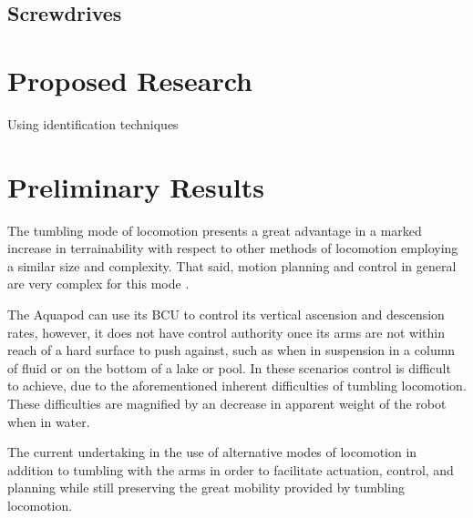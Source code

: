 



\subsection*{Screwdrives}

\section*{Proposed Research}

Using identification techniques  



\section*{Preliminary Results}

The tumbling mode of locomotion presents a great advantage in a marked increase
in terrainability with respect to other methods of locomotion employing a
similar size and complexity. That said, motion planning and control in general
are very complex for this mode \cite{Hemes2011}.

The Aquapod can use its BCU to control its vertical ascension and descension
rates, however, it does not have control authority once its arms are not within
reach of a hard surface to push against, such as when in suspension in a column
of fluid or on the bottom of a lake or pool. In these scenarios control is
difficult to achieve, due to the aforementioned inherent difficulties of
tumbling locomotion. These difficulties are magnified by an decrease in apparent
weight of the robot when in water.

The current undertaking in the use of alternative modes of locomotion in
addition to tumbling with the arms in order to facilitate actuation, control,
and planning while still preserving the great mobility provided by tumbling
locomotion.



